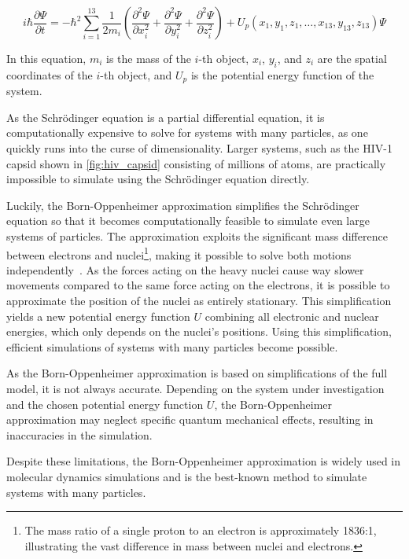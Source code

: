 \begin{equation}
      i \hbar \frac{\partial \Psi}{\partial t} = -\hbar^2 \sum_{i=1}^{13} \frac{1}{2m_i} \left( \frac{\partial^2 \Psi}{\partial x_i^2} + \frac{\partial^2 \Psi}{\partial y_i^2} + \frac{\partial^2 \Psi}{\partial z_i^2} \right) + U_p (x_1, y_1, z_1, \ldots, x_{13}, y_{13}, z_{13}) \Psi
\end{equation}

In this equation, $m_i$ is the mass of the $i$-th object, $x_i$, $y_i$, and $z_i$ are the spatial coordinates of the $i$-th object, and $U_p$ is the potential energy function of the system.
\smallskip

As the Schrödinger equation is a partial differential equation, it is computationally expensive to solve for systems with many particles, as one quickly runs into the curse of dimensionality. Larger systems, such as the HIV-1 capsid shown in \autoref{fig:hiv_capsid} consisting of millions of atoms, are practically impossible to simulate using the Schrödinger equation directly.

Luckily, the Born-Oppenheimer approximation simplifies the Schrödinger equation so that it becomes computationally feasible to simulate even large systems of particles. The approximation exploits the significant mass difference between electrons and nuclei\footnote{
      The mass ratio of a single proton to an electron is approximately 1836:1, illustrating the vast difference in mass between nuclei and electrons.
}, making it possible to solve both motions independently~\cite{Zielinski2013}. As the forces acting on the heavy nuclei cause way slower movements compared to the same force acting on the electrons, it is possible to approximate the position of the nuclei as entirely stationary. This simplification yields a new potential energy function $U$ combining all electronic and nuclear energies, which only depends on the nuclei's positions. Using this simplification, efficient simulations of systems with many particles become possible.

As the Born-Oppenheimer approximation is based on simplifications of the full model, it is not always accurate. Depending on the system under investigation and the chosen potential energy function $U$, the Born-Oppenheimer approximation may neglect specific quantum mechanical effects, resulting in inaccuracies in the simulation.

Despite these limitations, the Born-Oppenheimer approximation is widely used in molecular dynamics simulations and is the best-known method to simulate systems with many particles.

